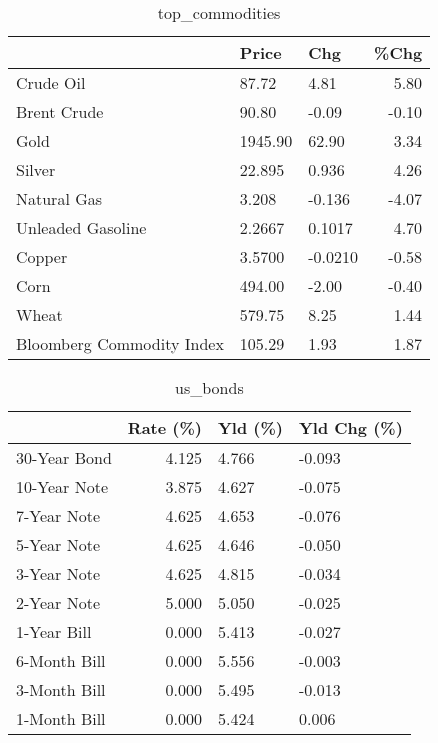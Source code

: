 \documentclass{article}%
\begin{document}
\begin{table}[htbp]%
\caption{top\_commodities}%
\centering%
\begin{adjustbox}{width=1\textwidth}%
\begin{tabular}{lllr}
\toprule
                          &   Price &     Chg &  \%Chg \\
\midrule
               Crude Oil  &   87.72 &    4.81 &  5.80 \\
             Brent Crude  &   90.80 &   -0.09 & -0.10 \\
                    Gold  & 1945.90 &   62.90 &  3.34 \\
                  Silver  &  22.895 &   0.936 &  4.26 \\
             Natural Gas  &   3.208 &  -0.136 & -4.07 \\
       Unleaded Gasoline  &  2.2667 &  0.1017 &  4.70 \\
                  Copper  &  3.5700 & -0.0210 & -0.58 \\
                    Corn  &  494.00 &   -2.00 & -0.40 \\
                   Wheat  &  579.75 &    8.25 &  1.44 \\
Bloomberg Commodity Index &  105.29 &    1.93 &  1.87 \\
\bottomrule
\end{tabular}
%
\end{adjustbox}%
\end{table}

%


\begin{table}[htbp]%
\caption{us\_bonds}%
\centering%
\begin{adjustbox}{width=1\textwidth}%
\begin{tabular}{lrll}
\toprule
             &  Rate (\%) & Yld (\%) & Yld Chg (\%) \\
\midrule
30-Year Bond &     4.125 &   4.766 &      -0.093 \\
10-Year Note &     3.875 &   4.627 &      -0.075 \\
 7-Year Note &     4.625 &   4.653 &      -0.076 \\
 5-Year Note &     4.625 &   4.646 &      -0.050 \\
 3-Year Note &     4.625 &   4.815 &      -0.034 \\
 2-Year Note &     5.000 &   5.050 &      -0.025 \\
 1-Year Bill &     0.000 &   5.413 &      -0.027 \\
6-Month Bill &     0.000 &   5.556 &      -0.003 \\
3-Month Bill &     0.000 &   5.495 &      -0.013 \\
1-Month Bill &     0.000 &   5.424 &       0.006 \\
\bottomrule
\end{tabular}
%
\end{adjustbox}%
\end{table}
\end{document}
